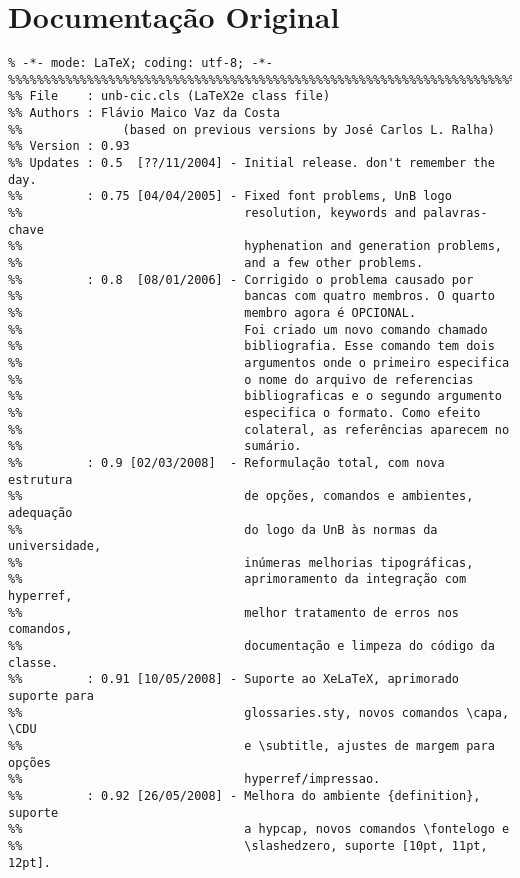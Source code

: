 \chapter{Documentação Original}%
\small\begin{verbatim}
% -*- mode: LaTeX; coding: utf-8; -*-
%%%%%%%%%%%%%%%%%%%%%%%%%%%%%%%%%%%%%%%%%%%%%%%%%%%%%%%%%%%%%%%%%%%%%%%%%%%%%%%
%% File    : unb-cic.cls (LaTeX2e class file)
%% Authors : Flávio Maico Vaz da Costa
%%              (based on previous versions by José Carlos L. Ralha)
%% Version : 0.93
%% Updates : 0.5  [??/11/2004] - Initial release. don't remember the day.
%%         : 0.75 [04/04/2005] - Fixed font problems, UnB logo
%%                               resolution, keywords and palavras-chave
%%                               hyphenation and generation problems,
%%                               and a few other problems.
%%         : 0.8  [08/01/2006] - Corrigido o problema causado por
%%                               bancas com quatro membros. O quarto
%%                               membro agora é OPCIONAL.
%%                               Foi criado um novo comando chamado
%%                               bibliografia. Esse comando tem dois
%%                               argumentos onde o primeiro especifica
%%                               o nome do arquivo de referencias
%%                               bibliograficas e o segundo argumento
%%                               especifica o formato. Como efeito
%%                               colateral, as referências aparecem no
%%                               sumário.
%%         : 0.9 [02/03/2008]  - Reformulação total, com nova estrutura
%%                               de opções, comandos e ambientes, adequação
%%                               do logo da UnB às normas da universidade,
%%                               inúmeras melhorias tipográficas,
%%                               aprimoramento da integração com hyperref,
%%                               melhor tratamento de erros nos comandos,
%%                               documentação e limpeza do código da classe.
%%         : 0.91 [10/05/2008] - Suporte ao XeLaTeX, aprimorado suporte para
%%                               glossaries.sty, novos comandos \capa, \CDU
%%                               e \subtitle, ajustes de margem para opções
%%                               hyperref/impressao.
%%         : 0.92 [26/05/2008] - Melhora do ambiente {definition}, suporte
%%                               a hypcap, novos comandos \fontelogo e
%%                               \slashedzero, suporte [10pt, 11pt, 12pt].

\end{verbatim}
